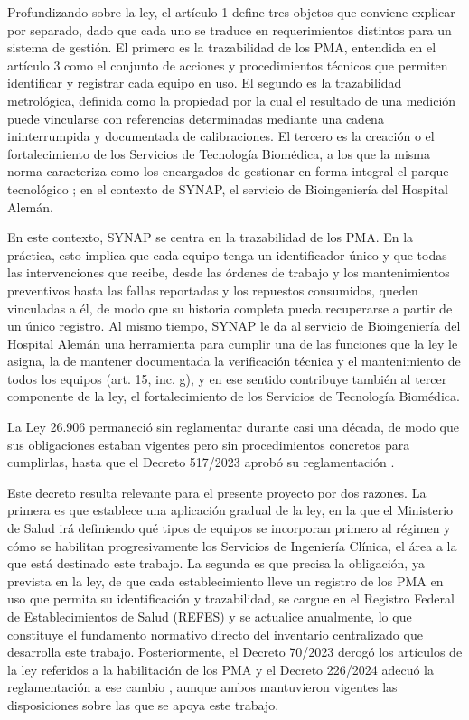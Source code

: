 \documentclass[10pt]{article}
\begin{document}
Profundizando sobre la ley, el artículo 1 define tres objetos que conviene explicar por separado, dado que cada uno se traduce en requerimientos distintos para un sistema de gestión. El primero es la trazabilidad de los PMA, entendida en el artículo 3 como el conjunto de acciones y procedimientos técnicos que permiten identificar y registrar cada equipo en uso. El segundo es la trazabilidad metrológica, definida como la propiedad por la cual el resultado de una medición puede vincularse con referencias determinadas mediante una cadena ininterrumpida y documentada de calibraciones. El tercero es la creación o el fortalecimiento de los Servicios de Tecnología Biomédica, a los que la misma norma caracteriza como los encargados de gestionar en forma integral el parque tecnológico \cite{ley_26906}; en el contexto de SYNAP, el servicio de Bioingeniería del Hospital Alemán.

En este contexto, SYNAP se centra en la trazabilidad de los PMA. En la práctica, esto implica que cada equipo tenga un identificador único y que todas las intervenciones que recibe, desde las órdenes de trabajo y los mantenimientos preventivos hasta las fallas reportadas y los repuestos consumidos, queden vinculadas a él, de modo que su historia completa pueda recuperarse a partir de un único registro. Al mismo tiempo, SYNAP le da al servicio de Bioingeniería del Hospital Alemán una herramienta para cumplir una de las funciones que la ley le asigna, la de mantener documentada la verificación técnica y el mantenimiento de todos los equipos (art. 15, inc. g), y en ese sentido contribuye también al tercer componente de la ley, el fortalecimiento de los Servicios de Tecnología Biomédica.

La Ley 26.906 permaneció sin reglamentar durante casi una década, de modo que sus obligaciones estaban vigentes pero sin procedimientos concretos para cumplirlas, hasta que el Decreto 517/2023 aprobó su reglamentación \cite{decreto_517_2023}. 

Este decreto resulta relevante para el presente proyecto por dos razones. La primera es que establece una aplicación gradual de la ley, en la que el Ministerio de Salud irá definiendo qué tipos de equipos se incorporan primero al régimen y cómo se habilitan progresivamente los Servicios de Ingeniería Clínica, el área a la que está destinado este trabajo. La segunda es que precisa la obligación, ya prevista en la ley, de que cada establecimiento lleve un registro de los PMA en uso que permita su identificación y trazabilidad, se cargue en el Registro Federal de Establecimientos de Salud (REFES) y se actualice anualmente, lo que constituye el fundamento normativo directo del inventario centralizado que desarrolla este trabajo. Posteriormente, el Decreto 70/2023 derogó los artículos de la ley referidos a la habilitación de los PMA \cite{decreto_70_2023} y el Decreto 226/2024 adecuó la reglamentación a ese cambio \cite{decreto_226_2024}, aunque ambos mantuvieron vigentes las disposiciones sobre las que se apoya este trabajo.
\end{document}
